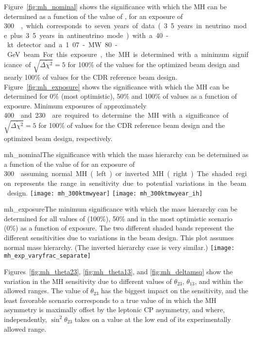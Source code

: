 Figure~\ref{fig:mh_nominal} shows the significance with which the MH
can be determined as a function of the value of \deltacp, for an
exposure of \SI{300}~\ktMWyr, which corresponds to seven years of data
(3.5 years in neutrino mode plus 3.5 years in antineutrino mode) with
a 40-kt detector and a 1.07-MW 80-GeV beam.  For this exposure, the MH
is determined with a minimum significance of
$\sqrt{\overline{\Delta\chi^{2}}} = 5$ for 100\% of the \deltacp
values for the optimized beam design and nearly 100\% of \deltacp
values for the CDR reference beam design.
Figure~\ref{fig:mh_exposure} shows the significance with which the MH
can be determined for 0\% (most optimistic), 50\% and 100\% of
\deltacp values as a function of exposure.  Minimum exposures of
approximately \SI{400}~\ktMWyr{} and \SI{230}~\ktMWyr{} are required
to determine the MH with a significance of
$\sqrt{\overline{\Delta\chi^2}} = 5$ for 100\% of \deltacp values for
the CDR reference beam design and the optimized beam design,
respectively.

\begin{cdrfigure}{mh_nominal}{The significance with which the mass hierarchy can be determined as a function of the value of \deltacp for an exposure of \SI{300}~\ktMWyr{} assuming normal MH (left) or inverted MH (right).  The shaded region represents the range in sensitivity due to potential variations in the beam design.}
 \texttt{[image: mh\_300ktmwyear]}
 \texttt{[image: mh\_300ktmwyear\_ih]}
\end{cdrfigure}

\begin{cdrfigure}{mh_exposure}{The minimum significance with which the mass hierarchy can be determined for all values of \deltacp (100\%), 50\% and in the most optimistic scenario (0\%) as a function of exposure.  The two different shaded bands represent the different sensitivities due to variations in the beam design. This plot assumes normal mass hierarchy. (The inverted hierarchy case is very similar.) }
 \texttt{[image: mh\_exp\_varyfrac\_separate]}
\end{cdrfigure}

Figures~\ref{fig:mh_theta23}, \ref{fig:mh_theta13}, and
\ref{fig:mh_deltamsq} show the variation in the MH sensitivity due to
different values of $\theta_{23}$, $\theta_{13}$, and  within
the allowed ranges.  The value of $\theta_{23}$ has the biggest impact
on the sensitivity, and the least favorable scenario corresponds to a
true value of \deltacp in which the MH asymmetry is maximally offset
by the leptonic CP asymmetry, and where, independently,
$\sin^2{\theta_{23}}$ takes on a value at the low end of its
experimentally allowed range.

